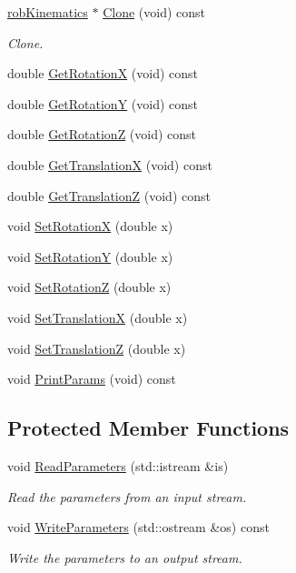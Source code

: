 \begin{DoxyCompactItemize}
\hyperlink{classrob_kinematics}{rob\+Kinematics} $\ast$ \hyperlink{classrob_modified_hayati_ab90f7548fb3995ef41a0c2349ef9f7db}{Clone} (void) const 
\begin{DoxyCompactList}\small\item\em Clone. \end{DoxyCompactList}\item 
double \hyperlink{classrob_modified_hayati_ac4d0b99a4bcaf84f7a230ca816a4df97}{Get\+Rotation\+X} (void) const 
\item 
double \hyperlink{classrob_modified_hayati_aa1717fcadff1ae71baae7e533d59a5c9}{Get\+Rotation\+Y} (void) const 
\item 
double \hyperlink{classrob_modified_hayati_a75e13e4379ca87e1a3bf1927eb6fe3fe}{Get\+Rotation\+Z} (void) const 
\item 
double \hyperlink{classrob_modified_hayati_a83119c072a7510d664e2ca5b936fe593}{Get\+Translation\+X} (void) const 
\item 
double \hyperlink{classrob_modified_hayati_a9955174220cae5588a5f207b873f3053}{Get\+Translation\+Z} (void) const 
\item 
void \hyperlink{classrob_modified_hayati_a200324621b9ffada977a5ab04565a857}{Set\+Rotation\+X} (double x)
\item 
void \hyperlink{classrob_modified_hayati_acc244d9c59715d99b3c49b435ddbb1d9}{Set\+Rotation\+Y} (double x)
\item 
void \hyperlink{classrob_modified_hayati_a5549a9381171d9ce5cca73f282ffabcf}{Set\+Rotation\+Z} (double x)
\item 
void \hyperlink{classrob_modified_hayati_aa280e443e4e6fbdc8d70e597a4234445}{Set\+Translation\+X} (double x)
\item 
void \hyperlink{classrob_modified_hayati_a82afe19aee6735e461589aa3df38a257}{Set\+Translation\+Z} (double x)
\item 
void \hyperlink{classrob_modified_hayati_a0d5d59f712f43dc403b9e5bee0810cc1}{Print\+Params} (void) const 
\end{DoxyCompactItemize}
\subsection*{Protected Member Functions}
\begin{DoxyCompactItemize}
\item 
void \hyperlink{classrob_modified_hayati_aabe09b18ecd7bf23a466d9855f17a431}{Read\+Parameters} (std\+::istream \&is)
\begin{DoxyCompactList}\small\item\em Read the parameters from an input stream. \end{DoxyCompactList}\item 
void \hyperlink{classrob_modified_hayati_a3e487aaa0708be391310862b0579d282}{Write\+Parameters} (std\+::ostream \&os) const 
\begin{DoxyCompactList}\small\item\em Write the parameters to an output stream. \end{DoxyCompactList}\end{DoxyCompactItemize}
